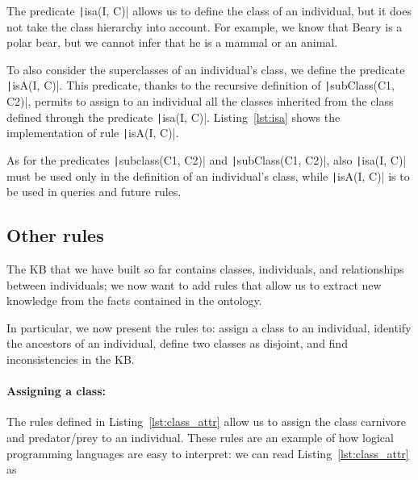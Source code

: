 The predicate \texttt|isa(I, C)| allows us to define the class of an individual, but it does not take the class hierarchy into account. For example, we know that Beary is a polar bear, but we cannot infer that he is a mammal or an animal.

To also consider the superclasses of an individual’s class, we define the predicate \texttt|isA(I, C)|. This predicate, thanks to the recursive definition of \texttt|subClass(C1, C2)|, permits to assign to an individual all the classes inherited from the class defined through the predicate \texttt|isa(I, C)|. Listing~\ref{lst:isa} shows the implementation of rule \texttt|isA(I, C)|.

\begin{listing}[h]
	\caption{isA predicate}
	\label{lst:isa}
\end{listing}

As for the predicates \texttt|subclass(C1, C2)| and \texttt|subClass(C1, C2)|, also \texttt|isa(I, C)| must be used only in the definition of an individual's class, while \texttt|isA(I, C)| is to be used in queries and future rules.

\subsection{Other rules}
The KB that we have built so far contains classes, individuals, and relationships between individuals; we now want to add rules that allow us to extract new knowledge from the facts contained in the ontology. 

In particular, we now present the rules to: assign a class to an individual, identify the ancestors of an individual, define two classes as disjoint, and find inconsistencies in the KB.

\paragraph{Assigning a class:} The rules defined in Listing~\ref{lst:class_attr} allow us to assign the class carnivore and predator/prey to an individual. These rules are an example of how logical programming languages are easy to interpret: we can read Listing~\ref{lst:class_attr} as 
\begin{listing}[h]
	\caption{Class attribution rules}
	\label{lst:class_attr}
\end{listing}

